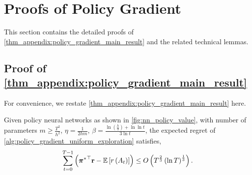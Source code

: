 \section{Proofs of Policy Gradient}

This section contains the detailed proofs of \cref{thm_appendix:policy_gradient_main_result} and the related technical lemmas.

\subsection{Proof of \cref{thm_appendix:policy_gradient_main_result}}

For convenience, we restate \cref{thm_appendix:policy_gradient_main_result} here.

\begin{thm}
	\label{thm_appendix:policy_gradient_main_result}
	Given policy neural networks as shown in \cref{fig:nn_policy_value}, with number of parameters $m \ge \frac{T^2}{h^2}$, $\eta = \frac{1}{2 h m}$, $\beta = \frac{ \ln{\left(\frac{h}{3}\right) + \ln{\ln{t}} } }{ 3 \ln{t}}$, the expected regret of \cref{alg:policy_gradient_uniform_exploration} satisfies,
	\begin{equation*}
	\begin{split}
	\sum\limits_{t=0}^{T-1}{ \left( {{\boldsymbol{\pi}}^*}^\top {\mathbf{r}} - {\mathbb{E}} \left[ r\left(A_t\right) \right] \right)} \le O\left(T^{\frac{2}{3}}\left( \ln{T} \right)^{\frac{1}{3}}\right).
	\end{split}
	\end{equation*}
\end{thm}
